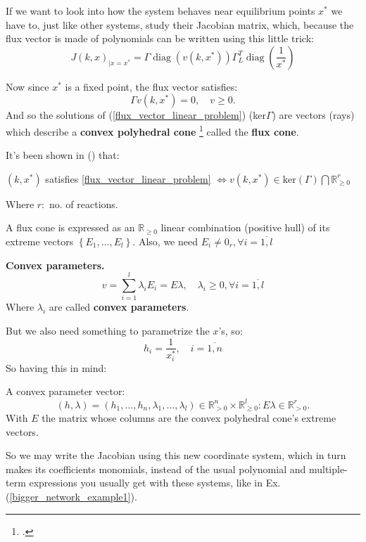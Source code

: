 If we want to look into how the system behaves near equilibrium points $x^*$ we have to, just like other systems, study their Jacobian matrix, which, because the flux vector is made of polynomials can be written using this little trick:
\[
	J(k, x)_{\mid x=x^*}=\Gamma \operatorname{diag}\left(v\left(k, x^*\right)\right) \Gamma_L^T \operatorname{diag}\left(\frac{1}{x^*}\right)
\]

Now since $x^*$ is a fixed point, the flux vector satisfies:
\begin{equation}\label{flux_vector_linear_problem}
	\Gamma v(k,x^*) = 0, \quad v \geq 0.
\end{equation}
And so the solutions of (\ref{flux_vector_linear_problem}) (ker$\Gamma$) are vectors (rays) which describe a \textbf{convex polyhedral cone} \footcite{dattorro2018Convex} called the \textbf{flux cone}.

It's been shown in (\cite{clarke1980stability}) that:

$(k,x^*)$ satisfies \ref{flux_vector_linear_problem} $\iff  v(k,x^*)\in \text{ker}(\Gamma) \bigcap \mathbb{R}^r_{\geq 0}$

Where $r:$ no. of reactions.

A flux cone is expressed as an $\mathbb{R}_{\geq 0}$ linear combination (positive hull) of its extreme vectors $\left\{ E_1 , \ldots , E_l \right\}$. Also, we need $E_i \neq 0_r, \forall i = \overline{1,l}$

\begin{definition}\label{convex_params_definition}
	\textbf{Convex parameters.}
	\begin{equation}\label{flux_cone}
		\boxed{		v=\sum_{i=1}^l \lambda_i E_i=E \lambda, \quad \lambda_i \geq 0, \forall i = \overline{1,l} }
	\end{equation}
	Where $\lambda_i$ are called \textbf{convex parameters}.
\end{definition}
But we also need something to parametrize the $x$'s, so:
\begin{equation}\label{other_convex_parameters}
	\boxed{	h_i=\frac{1}{x_i^*}, \quad i = \overline{1,n} }
\end{equation}
So having this in mind:
\begin{definition}
	A convex parameter vector:
	\[
		(h, \lambda) = (h_1, \ldots, h_n , \lambda_1, \ldots , \lambda_l) \in \mathbb{R}_{>0}^n \times \mathbb{R}_{\geq 0}^{l} : E \lambda \in \mathbb{R}^r_{> 0}.
	\]
	With $E$ the matrix whose columns are the convex polyhedral cone's extreme vectors.
\end{definition}
So we may write the Jacobian using this new coordinate system, which in turn makes its coefficients monomials, instead of the usual polynomial and multiple-term expressions you usually get with these systems, like in Ex. (\ref{bigger_network_example1}).
\newcommand\eqCuzConvex{\stackrel{\mathclap{\normalfont\mbox{\ref{flux_vector_linear_problem}, \ref{convex_params_definition}}}}{=\joinrel=\joinrel=\joinrel=\joinrel=}}

